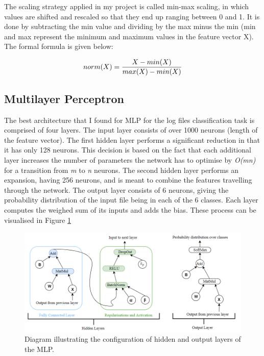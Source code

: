 The scaling strategy applied in my project is called min-max scaling, in which values are
shifted and rescaled so that they end up ranging between 0 and 1. It is done by subtracting the min value and dividing by the max minus the min (min and max represent the minimum and maximum values in the feature vector X). The formal formula is given below: 

\begin{equation}
    \centering
    norm(X) = \frac{X - min(X)}{max(X) - min(X)}
\end{equation}

\subsection{Multilayer Perceptron}

The best architecture that I found for MLP for the log files classification task is comprised of four layers. The input layer consists of over 1000 neurons (length of the feature vector). The first hidden layer performs a significant reduction in that it has only 128 neurons. This decision is based on the fact that each additional layer increases the number of parameters the network has to optimise by \textit{O(mn)} for a transition from \textit{m} to \textit{n} neurons. The second hidden layer performs an expansion, having 256 neurons, and is meant to combine the features travelling through the network. The output layer consists of 6 neurons, giving the probability distribution of the input file being in each of the 6 classes. Each layer computes the weighed sum of its inputs and adds the bias. These process can be visualised in Figure \ref{mlp_layers} 

\begin{figure}[H]
  \centering
  \centerline{\includegraphics[scale=0.5]{Images/mlp_layers.png}}
  \caption{Diagram illustrating the configuration of hidden and output layers of the MLP.}
  \label{mlp_layers}
\end{figure}

